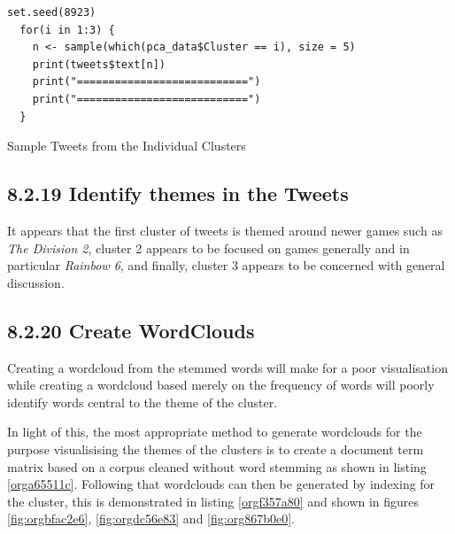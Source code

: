 \documentclass[11pt]{article}
\begin{document}
\begin{listing}[htbp]
\begin{verbatim}
set.seed(8923)
  for(i in 1:3) {
    n <- sample(which(pca_data$Cluster == i), size = 5)
    print(tweets$text[n])
    print("===========================")
    print("===========================")
  }
\end{verbatim}
\caption{\label{orgd925cca}Sample Tweets from the Individual Clusters}
\end{listing}

\subsection{8.2.19 Identify themes in the Tweets}
\label{sec:org21dacbc}
It appears that the first cluster of tweets is themed around newer games such as \emph{The Division 2}, cluster 2 appears to be focused on games generally and in particular \emph{Rainbow 6}, and finally, cluster 3 appears to be concerned with general discussion.

\subsection{8.2.20 Create WordClouds}
\label{sec:org766ee24}
Creating a wordcloud from the stemmed words will make for a poor visualisation
while creating a wordcloud based merely on the frequency of words will poorly
identify words central to the theme of the cluster.

In light of this, the most appropriate method to generate wordclouds for the
purpose visualisising the themes of the clusters is to create a document term
matrix based on a corpus cleaned without word stemming as shown in listing \ref{orga65511c}.
Following that wordclouds can then be generated by indexing for the cluster,
this is demonstrated in listing \ref{orgf357a80} and shown in figures \ref{fig:orgbfac2e6}, \ref{fig:orgdc56e83} and \ref{fig:org867b0e0}.
\end{document}
